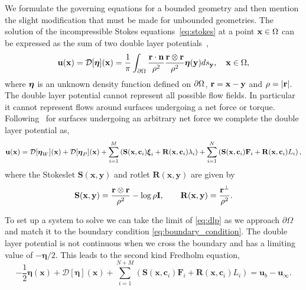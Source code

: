 \documentclass[preprint, 10pt]{elsarticle}
\begin{document}

We formulate the governing equations for a bounded geometry and then
mention the slight modification that must be made for unbounded
geometries.  The solution of the incompressible Stokes
equations~\eqref{eq:stokes} at a point ${\mathbf{x}} \in \Omega$ can be expressed
as the sum of two double layer potentials~\cite{Ladyzhenskaya1963,
Pozrikidis1992},
\begin{align}
  \label{eq:dlp}
  {\mathbf{u}}({\mathbf{x}}) = {\mathcal{D}}[{\boldsymbol\eta}]({\mathbf{x}}) = \frac{1}{\pi}\int_{{\partial}\Omega}
  \frac{{\mathbf{r}}\cdot\mathbf{n}}{\rho^2}\frac{{\mathbf{r}} \otimes {\mathbf{r}}}{\rho^2}
  {\boldsymbol\eta}({\mathbf{y}}) ds_{{\mathbf{y}}}, \quad {\mathbf{x}} \in \Omega,
\end{align}
where ${\boldsymbol\eta}$ is an unknown density function defined  on ${\partial}\Omega$,
${\mathbf{r}} = {\mathbf{x}} - {\mathbf{y}}$ and $\rho=|{\mathbf{r}}|$.  The double layer potential cannot
represent all possible flow fields. In particular it cannot represent
flows around surfaces undergoing a net force or torque.
Following~\cite{Power1987, Power1993} for surfaces undergoing an
arbitrary net force we complete the double layer potential as,
\begin{align*}
  {\mathbf{u}}({\mathbf{x}}) = {\mathcal{D}}[{\boldsymbol\eta}_W]({\mathbf{x}}) + {\mathcal{D}}[{\boldsymbol\eta}_P]({\mathbf{x}}) + \sum_{i=1}^M 
    \left(\mathbf{S}({\mathbf{x}},{\mathbf{c}}_i){\boldsymbol{\xi}}_i + 
    \mathbf{R}({\mathbf{x}},{\mathbf{c}}_i)\lambda_i\right) + \sum_{i=1}^N 
    \left(\mathbf{S}({\mathbf{x}},{\mathbf{c}}_i){\mathbf{F}}_i + 
    \mathbf{R}({\mathbf{x}},{\mathbf{c}}_i)L_i\right),
\end{align*}
where the Stokeslet $\mathbf{S}(\mathbf{x},\mathbf{y})$ and rotlet $\mathbf{R}(\mathbf{x},\mathbf{y})$ are given by
\begin{align*}
  \mathbf{S}({\mathbf{x}},{\mathbf{y}}) = \frac{{\mathbf{r}} \otimes {\mathbf{r}}}{\rho^2} - 
  \log\rho\mathbf{I}, \qquad 
  \mathbf{R}({\mathbf{x}},{\mathbf{y}}) = \frac{{\mathbf{r}}^\perp}{\rho^2}.
\end{align*}

To set up a system to solve we can take the limit of \eqref{eq:dlp} as we approach $\partial\Omega$ and match it to the boundary condition \eqref{eq:boundary_condition}. The double layer potential is not continuous when we cross the boundary and has a limiting value of $-\pmb{\eta}/2$. This leads to the second kind Fredholm equation,
\begin{equation}\label{eq:vel_walls} -\frac{1}{2}\pmb{\eta}(\mathbf{x}) + \mathcal{D}[\pmb{\eta}](\mathbf{x}) + \sum\limits_{i=1}^{N+M} \left(\mathbf{S}(\mathbf{x},\mathbf{c}_i)\mathbf{F}_i + \mathbf{R}(\mathbf{x},\mathbf{c}_i)L_i\right) = \mathbf{u}_b - \mathbf{u}_\infty.\end{equation}
\end{document}
